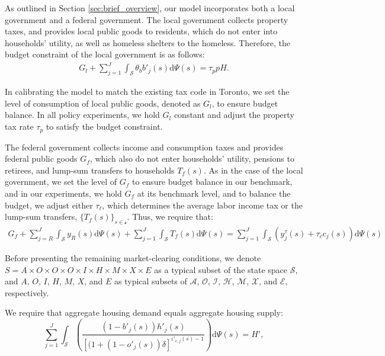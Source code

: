 \documentclass[parskip=full]{article}
\begin{document}
As outlined in Section \ref{sec:brief_overview}, our model incorporates both a local government and a federal government. The local government collects property taxes, and provides local public goods to residents, which do not enter into households' utility, as well as homeless shelters to the homeless. Therefore, the budget constraint of the local government is as follows:
\begin{align}\label{eq:gbc_1}
  G_l +\sum_{j=1}^J \int_\mathcal{S} \theta_{b} b'_{j}(s)\mathrm{d}\Psi(s) = \tau_{p} p H.
\end{align}

\noindent In calibrating the model to match the existing tax code in Toronto, we set the level of consumption of local public goods, denoted as $G_l$, to ensure budget balance. In all policy experiments, we hold $G_l$ constant and adjust the property tax rate $\tau_{p}$ to satisfy the budget constraint.

The federal government collects income and consumption taxes and provides federal public goods $G_{f}$, which also do not enter households' utility, pensions to retirees, and lump-sum transfers to households $T_{f}(s)$. As in the case of the local government, we set the level of $G_{f}$ to ensure budget balance in our benchmark, and in our experiments, we hold $G_{f}$ at its benchmark level, and to balance the budget, we adjust either $\tau_\ell$, which determines the average labor income tax or the lump-sum transfers, $\{T_{f}(s)\}_{s\in \mathcal{s}}$. Thus, we require that:
\begin{align}\label{eq:gbc_2}
   G_{f}+\sum_{j=R}^J \int_\mathcal{S} y_{R}(s)\mathrm{d}\Psi(s)+\sum_{j=1}^J \int_\mathcal{S} T_f(s) \mathrm{d}\Psi(s)=\sum_{j=1}^J \int_\mathcal{S} \left(y^{\tau}_{j}(s)+\tau_{c}c_{j}(s)\right)\mathrm{d}\Psi(s) 
\end{align}

Before presenting the remaining market-clearing conditions, we denote $S=A\times O \times O \times O \times I \times H\times M\times X \times E$ as a typical subset of the state space $\mathcal{S}$, and $A$, $O$, $I$, $H$, $M$, $X$, and $E$ as typical subsets of $\mathcal{A}$, $\mathcal{O}$, $\mathcal{I}$, $\mathcal{H}$, $\mathcal{M}$, $\mathcal{X}$, and $\mathcal{E}$, respectively.

We require that aggregate housing demand equals aggregate housing supply:
\begin{equation}
\label{eq:housing_clearing_condition}
  \sum_{j=1}^J \int_\mathcal{S}  \left(\frac{(1-b'_{j}(s))h'_{j}(s)}{\left[(1+(1-o'_{j}(s))\delta \right]^{\iota'_{c,j}(s)-1}}\right) \mathrm{d}\Psi(s) = H',
\end{equation}
\end{document}
